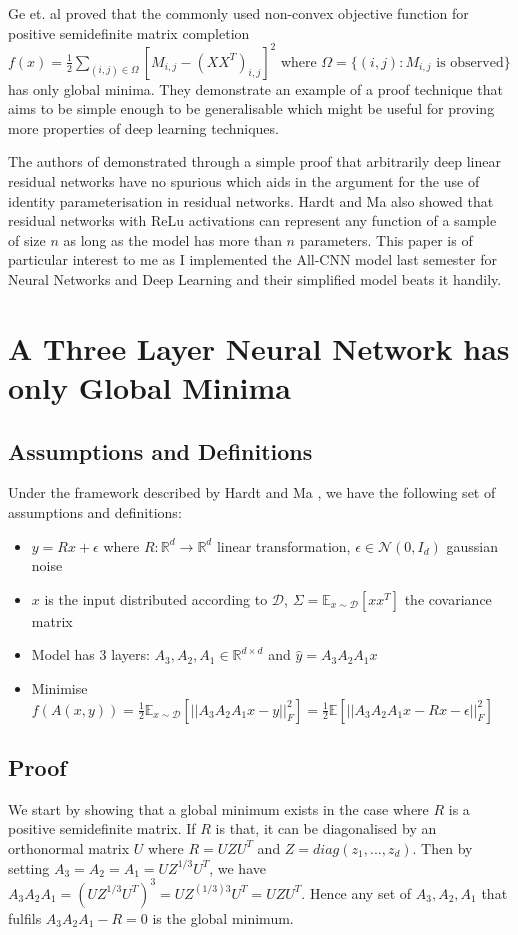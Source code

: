 \documentclass[12pt]{article}
\begin{document}
 Ge et. al  \cite{ge2016matrix} proved that the commonly used non-convex objective function for positive semidefinite matrix completion $f(x) = \frac{1}{2} \sum_{(i,j) \in  \Omega} [M_{i, j} - (X X^T)_{i, j}]^2$ where $\Omega = \{(i, j): M_{i,j} \textrm{ is observed}\}$ has only global minima. They demonstrate an example of a proof technique that aims to be simple enough to be generalisable which might be useful for proving more properties of deep learning techniques.
 
 The authors of \cite{hardt2016identity} demonstrated through a simple proof that arbitrarily deep linear residual networks have no spurious which aids in the argument for the use of identity parameterisation in residual networks. Hardt and Ma also showed that residual networks with ReLu activations can represent any function of a sample of size $n$ as long as the model has more than $n$ parameters. This paper is of particular interest to me as I implemented the All-CNN model last semester for Neural Networks and Deep Learning and their simplified model beats it handily.
 
 \section*{A Three Layer Neural Network has only Global Minima}
 \subsection*{Assumptions and Definitions}
 Under the framework described by Hardt and Ma \cite{hardt2016identity}, we have the following set of assumptions and definitions:
 \begin{itemize}
 \item $y = Rx + \epsilon$ where $R : \mathbb{R}^d \rightarrow \mathbb{R}^d $ linear transformation, $\epsilon \in \mathcal{N}(0, I_d)$ gaussian noise
 \item $x$ is the input distributed according to $\mathcal{D}$, $\Sigma = \mathbb{E}_{x \sim \mathcal{D}}[xx^T]$ the covariance matrix 
 \item Model has 3 layers: $A_3, A_2, A_1 \in \mathbb{R}^{d \times d}$ and $\hat{y} = A_3 A_2 A_1 x$
 \item Minimise $f(A(x, y)) = \frac{1}{2}\mathbb{E}_{x \sim \mathcal{D}}[||A_3 A_2 A_1 x -y||_F^2] = \frac{1}{2}\mathbb{E}[|| A_3 A_2 A_1 x - Rx - \epsilon||_F^2]$
 \end{itemize}
 
 \subsection*{Proof}
 We start by showing that a global minimum exists in the case where $R$ is a positive semidefinite matrix. If $R$ is that, it can be diagonalised by an orthonormal matrix $U$ where $R = UZU^T$ and $Z = diag(z_1, ..., z_d)$. Then by setting $A_3 = A_2 = A_1 = U Z^{1/3} U^T$, we have $A_3 A_2 A_1 = (U Z^{1/3} U^T)^3 = U Z^{(1/3)3} U^T = UZU^T$. Hence any set of $A_3, A_2, A_1$ that fulfils $A_3 A_2 A_1 - R = 0$ is the global minimum.
 
\end{document}
